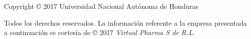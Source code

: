 \thispagestyle{empty}
{\small
\strut\vfill %
\noindent Copyright \copyright{} 2017 Universidad Nacional Autónoma de Honduras\par
\vspace{0.2cm}
\noindent Todos los derechos reservados. La información referente a la empresa presentada a continuación es cortesía de \copyright{} 2017 \emph{Virtual Pharma S de R.L.}
}
\clearpage

